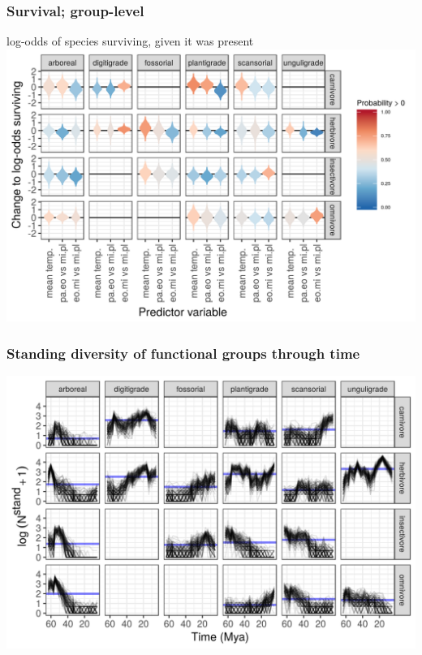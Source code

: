 \documentclass{beamer}
\begin{document}
\begin{frame}
  \frametitle{Survival; group-level}
  \begin{center}
    log-odds of species surviving, given it was present
    \includegraphics[height=0.8\textheight,width=\textwidth,keepaspectratio=true]{figure/group_on_survival_bd}
  \end{center}
\end{frame}

\begin{frame}
  \frametitle{Standing diversity of functional groups through time}
  \begin{center}
    \includegraphics[height=0.8\textheight,width=\textwidth,keepaspectratio=true]{figure/ecotype_diversity}
  \end{center}
\end{frame}
\end{document}
